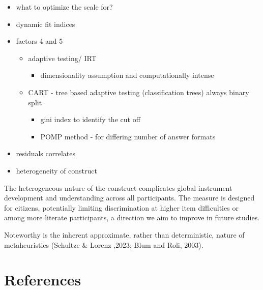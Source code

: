 \documentclass[
  12pt,
  a4paper,
  twoside]{article}
\providecommand{\tightlist}{%
  \setlength{\itemsep}{0pt}\setlength{\parskip}{0pt}}
\begin{document}
\begin{itemize}
\tightlist
\item
  what to optimize the scale for?
\item
  dynamic fit indices
\item
  factors 4 and 5

  \begin{itemize}
  \tightlist
  \item
    adaptive testing/ IRT

    \begin{itemize}
    \tightlist
    \item
      dimensionality assumption and computationally intense
    \end{itemize}
  \item
    CART - tree based adaptive testing (classification trees) always binary split

    \begin{itemize}
    \tightlist
    \item
      gini index to identify the cut off
    \item
      POMP method - for differing number of answer formats
    \end{itemize}
  \end{itemize}
\item
  residuals correlates
\item
  heterogeneity of construct
\end{itemize}

The heterogeneous nature of the construct complicates global instrument development and understanding across all participants. The measure is designed for citizens, potentially limiting discrimination at higher item difficulties or among more literate participants, a direction we aim to improve in future studies.

Noteworthy is the inherent approximate, rather than deterministic, nature of metaheuristics (Schultze \& Lorenz ,2023; Blum and Roli, 2003).

\section*{References}\label{references}
\end{document}
